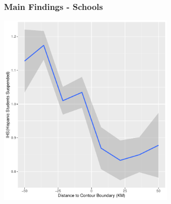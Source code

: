 \documentclass{beamer}
\begin{document}
\begin{frame}
\frametitle{Main Findings - Schools}
\centering
        \includegraphics[width=0.65\textwidth]{../../analysis/Output/graphs/hispanicsuspensions.pdf}\\
\end{frame}

\end{document}
